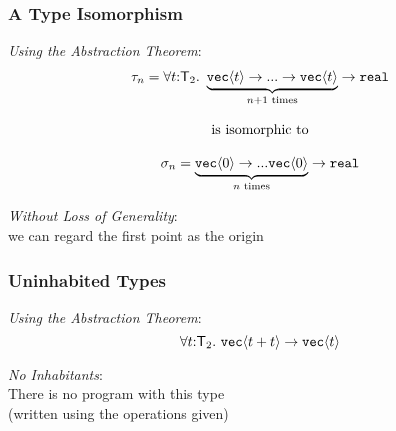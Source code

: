 \documentclass[xetex,serif,mathserif]{beamer}
\newcommand{\SynTransl}[1]{\mathsf{T}_#1}
\newcommand{\tyPrim}[2]{\textup{\texttt{#1}}\langle #2 \rangle}
\newcommand{\tyPrimNm}[1]{\textup{\texttt{#1}}}
\newenvironment{slide}[1]{\begin{frame}\frametitle{#1}}{\end{frame}}
\begin{document}
\begin{slide}{A Type Isomorphism}
  \textcolor{titlered}{\emph{Using the Abstraction Theorem}}:
  \begin{displaymath}
    \begin{array}{c}
      \tau_{n} = \forall
      t\mathord:\SynTransl{2}.\ \underbrace{\tyPrim{vec}{t} \to ... \to
        \tyPrim{vec}{t}}_{n+1\textrm{ times}} \to \tyPrimNm{real}
      \\
      \\
      \textrm{is isomorphic to}
      \\
      \\
      \sigma_{n} = \underbrace{\tyPrim{vec}{0} \to
        ... \tyPrim{vec}{0}}_{n\textrm{ times}} \to \tyPrimNm{real}
    \end{array}
  \end{displaymath}

  \medskip
  \textcolor{titlered}{\emph{Without Loss of Generality}}: \\
  \quad we can regard the first point as the origin
\end{slide}

\begin{slide}{Uninhabited Types}
  \textcolor{titlered}{\emph{Using the Abstraction Theorem}}:
  \begin{displaymath}
    \forall t \mathord: \SynTransl{2}.~\tyPrim{vec}{t + t} \to \tyPrim{vec}{t}
  \end{displaymath}

  \bigskip

  \textcolor{titlered}{\emph{No Inhabitants}}: \\
  \quad There is no program with this type \\
  \quad\quad (written using the operations given)
\end{slide}
\end{document}
